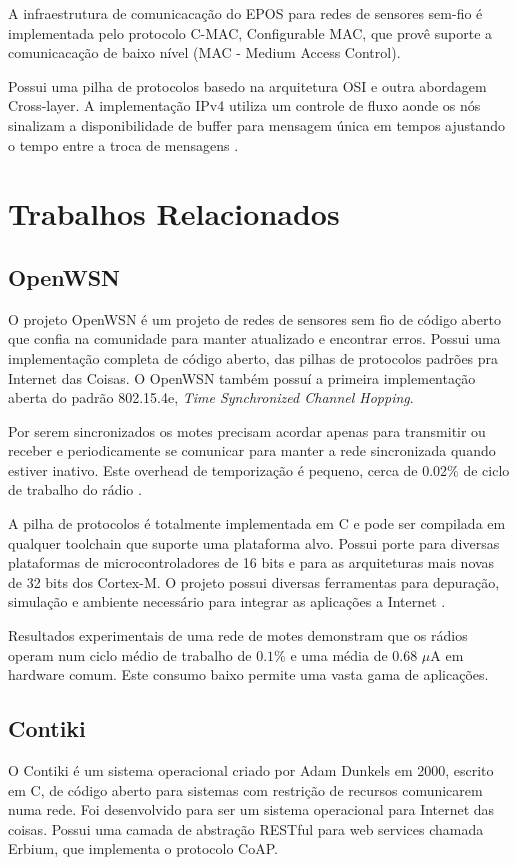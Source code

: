 A infraestrutura de comunicaca\c{c}\~ao do EPOS para redes de sensores sem-fio \'e implementada pelo protocolo C-MAC, Configurable MAC, que prov\^e suporte a comunicaca\c{c}\~ao de baixo n\'ivel (MAC - Medium Access Control).

Possui uma pilha de protocolos basedo na arquitetura OSI e outra abordagem Cross-layer. A implementa\c{c}\~ao IPv4 utiliza um controle de fluxo aonde os n\'os sinalizam a disponibilidade de buffer para mensagem \'unica em tempos ajustando o tempo entre a troca de mensagens \cite{frohlich2013cross}.


\section{Trabalhos Relacionados}

\subsection{OpenWSN}

O projeto OpenWSN \'e um projeto de redes de sensores sem fio de c\'odigo aberto que confia na comunidade para manter atualizado e encontrar erros. Possui uma implementa\c{c}\~ao completa de c\'odigo aberto, das pilhas de protocolos padr\~oes pra Internet das Coisas. O OpenWSN tamb\'em possu\'i a primeira implementa\c{c}\~ao aberta do padr\~ao 802.15.4e, \textit{Time Synchronized Channel Hopping}.

Por serem sincronizados os motes precisam acordar apenas para transmitir ou receber e periodicamente se comunicar para manter a rede sincronizada quando estiver inativo. Este overhead de temporiza\c{c}\~ao \'e pequeno, cerca de 0.02\% de ciclo de trabalho do r\'adio \cite{openWSNPaper}.

A pilha de protocolos \'e totalmente implementada em C e pode ser compilada em qualquer toolchain que suporte uma plataforma alvo. Possui porte para diversas plataformas de microcontroladores de 16 bits e para as arquiteturas mais novas de 32 bits dos Cortex-M. O projeto possui diversas ferramentas para depura\c{c}\~ao, simula\c{c}\~ao e ambiente necess\'ario para integrar as aplica\c{c}\~oes a Internet \cite{openWSN}.

Resultados experimentais de uma rede de motes demonstram que os r\'adios operam num ciclo m\'edio de trabalho de $0.1\%$ e uma m\'edia de 0.68 $\mu$A em hardware comum. Este consumo baixo permite uma vasta gama de aplica\c{c}\~oes.

\subsection{Contiki}
O Contiki \'e um sistema operacional criado por Adam Dunkels em 2000, escrito em C, de c\'odigo aberto para sistemas com restri\c{c}\~ao de recursos comunicarem numa rede. Foi desenvolvido para ser um sistema operacional para Internet das coisas. Possui uma camada de abstra\c{c}\~ao RESTful para web services chamada Erbium, que implementa o protocolo CoAP.

